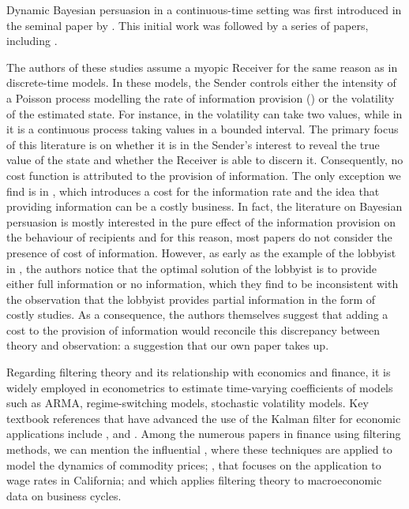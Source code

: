 \documentclass[a4paper,10pt]{article}
\theoremstyle{definition}
\theoremstyle{plain}
\numberwithin{equation}{section}
\begin{document}
Dynamic Bayesian persuasion in a continuous-time setting was first introduced in the seminal paper by \cite{Ely17}. This initial work was followed by a series of papers, including \cite{Orlov20, Ely19, Bizzotto21, Liao21, Ball23, Yao23, Escude23}. 

The authors of these studies assume a myopic Receiver for the same reason as in discrete-time models. 
In these models, the Sender controls either the intensity of a Poisson process modelling the rate of information provision (\cite{Ely17}) or the volatility of the estimated state.  For instance, in \cite{Liao21} the volatility can take two values, while in \cite{Escude23}  it is a continuous process taking values in a bounded interval. 
The primary focus of this literature is  on whether it is in the Sender's interest to reveal the true value of the state and whether the Receiver is able to discern it. Consequently, no cost function is attributed to the provision of information. 
The only exception we find is in \cite{Che23}, which introduces a cost for the information rate and the idea that providing information can be a costly business.  
In fact, the literature on Bayesian persuasion is mostly interested in the pure effect of the information provision on the behaviour of recipients and for this reason, most papers do not consider the presence of cost of information. 
However, as early as the example of the lobbyist in \cite[Section V]{Kamenica11}, the authors notice that the optimal solution of the lobbyist is to provide either full information or no information, which they find to be inconsistent with the observation that the lobbyist provides partial information in the form of costly studies.  
As a consequence, the authors themselves suggest that adding a cost to the provision of information would reconcile this discrepancy between theory and observation: a suggestion that our own paper takes up.

Regarding filtering theory and its relationship with economics and finance, it is widely employed in econometrics to estimate time-varying coefficients of models such as ARMA, regime-switching models, stochastic volatility models. 
Key textbook references that have advanced the use  of the Kalman filter for economic applications include \cite{Harvey89}, \cite{Hamilton94} and \cite{Durbin01}. 
Among the numerous papers in finance using filtering methods, we can mention the influential \cite{Schwartz97}, where these techniques are applied to model the dynamics of commodity prices; \cite{Engle83}, that focuses on the application to wage rates in California; and \cite{Harvey93} which applies filtering theory to macroeconomic data on business cycles.
\end{document}
